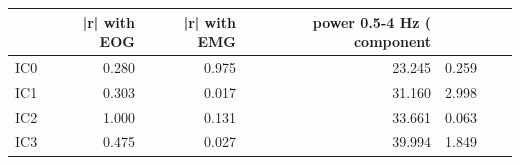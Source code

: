 \begin{tabular}{lrrrr}
\toprule
 & |r| with EOG & |r| with EMG & power 0.5-4 Hz (%
component &  &  &  &  \\
\midrule
IC0 & 0.280 & 0.975 & 23.245 & 0.259 \\
IC1 & 0.303 & 0.017 & 31.160 & 2.998 \\
IC2 & 1.000 & 0.131 & 33.661 & 0.063 \\
IC3 & 0.475 & 0.027 & 39.994 & 1.849 \\
\bottomrule
\end{tabular}
